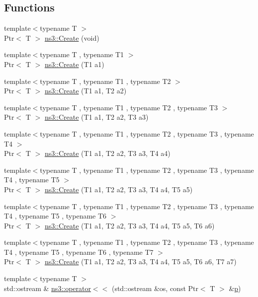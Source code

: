 \subsection*{Functions}
\begin{DoxyCompactItemize}
\item 
{\footnotesize template$<$typename T $>$ }\\Ptr$<$ T $>$ \hyperlink{group__ptr_ga0406dd2d929ceac05ce39d4579fa3e4b}{ns3\+::\+Create} (void)
\item 
{\footnotesize template$<$typename T , typename T1 $>$ }\\Ptr$<$ T $>$ \hyperlink{group__ptr_ga4c4eb07f3d5dc354e75547fa5524ec94}{ns3\+::\+Create} (T1 a1)
\item 
{\footnotesize template$<$typename T , typename T1 , typename T2 $>$ }\\Ptr$<$ T $>$ \hyperlink{group__ptr_ga965d2ed7b1c184da2296059b548fd31d}{ns3\+::\+Create} (T1 a1, T2 a2)
\item 
{\footnotesize template$<$typename T , typename T1 , typename T2 , typename T3 $>$ }\\Ptr$<$ T $>$ \hyperlink{group__ptr_ga76aa4ea28549ce911b336940029ddcea}{ns3\+::\+Create} (T1 a1, T2 a2, T3 a3)
\item 
{\footnotesize template$<$typename T , typename T1 , typename T2 , typename T3 , typename T4 $>$ }\\Ptr$<$ T $>$ \hyperlink{group__ptr_ga39f733eaa594e6e9bd7534dc5d8bec05}{ns3\+::\+Create} (T1 a1, T2 a2, T3 a3, T4 a4)
\item 
{\footnotesize template$<$typename T , typename T1 , typename T2 , typename T3 , typename T4 , typename T5 $>$ }\\Ptr$<$ T $>$ \hyperlink{group__ptr_ga8771433dc5d65a545e879ee23af7fd85}{ns3\+::\+Create} (T1 a1, T2 a2, T3 a3, T4 a4, T5 a5)
\item 
{\footnotesize template$<$typename T , typename T1 , typename T2 , typename T3 , typename T4 , typename T5 , typename T6 $>$ }\\Ptr$<$ T $>$ \hyperlink{group__ptr_gac4c3fad67381a06c3b279c632160f999}{ns3\+::\+Create} (T1 a1, T2 a2, T3 a3, T4 a4, T5 a5, T6 a6)
\item 
{\footnotesize template$<$typename T , typename T1 , typename T2 , typename T3 , typename T4 , typename T5 , typename T6 , typename T7 $>$ }\\Ptr$<$ T $>$ \hyperlink{group__ptr_ga6a9b4844f287f856a8e6e7ff54985fb4}{ns3\+::\+Create} (T1 a1, T2 a2, T3 a3, T4 a4, T5 a5, T6 a6, T7 a7)
\item 
{\footnotesize template$<$typename T $>$ }\\std\+::ostream \& \hyperlink{group__ptr_ga75e9cff782d3140d858f1ad129f23bd6}{ns3\+::operator$<$$<$} (std\+::ostream \&os, const Ptr$<$ T $>$ \&\hyperlink{lte__link__budget__x2__handover__measures_8m_ac9de518908a968428863f829398a4e62}{p})
\end{DoxyCompactItemize}
